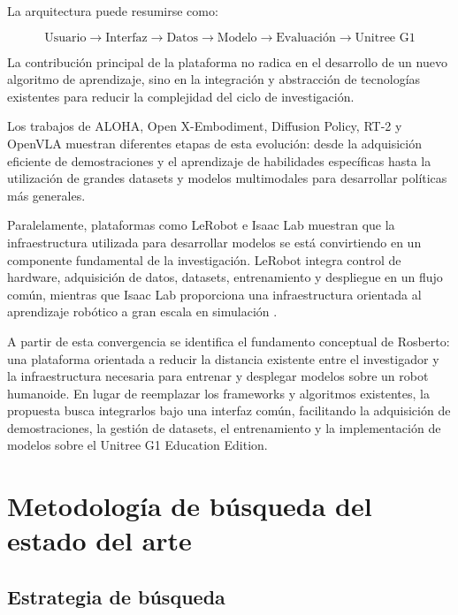 \documentclass[stu,12pt,floatsintext]{apa7}
\begin{document}
La arquitectura puede resumirse como:

\begin{equation}
\boxed{
\text{Usuario}
\rightarrow
\text{Interfaz}
\rightarrow
\text{Datos}
\rightarrow
\text{Modelo}
\rightarrow
\text{Evaluación}
\rightarrow
\text{Unitree G1}
}
\end{equation}

La contribución principal de la plataforma no radica en el desarrollo de un nuevo algoritmo de aprendizaje, sino en la integración y abstracción de tecnologías existentes para reducir la complejidad del ciclo de investigación.

Los trabajos de ALOHA, Open X-Embodiment, Diffusion Policy, RT-2 y OpenVLA muestran diferentes etapas de esta evolución: desde la adquisición eficiente de demostraciones y el aprendizaje de habilidades específicas hasta la utilización de grandes datasets y modelos multimodales para desarrollar políticas más generales.

Paralelamente, plataformas como LeRobot e Isaac Lab muestran que la infraestructura utilizada para desarrollar modelos se está convirtiendo en un componente fundamental de la investigación. LeRobot integra control de hardware, adquisición de datos, datasets, entrenamiento y despliegue en un flujo común, mientras que Isaac Lab proporciona una infraestructura orientada al aprendizaje robótico a gran escala en simulación \parencite{cadene2026lerobotopensourcelibraryendtoend}.

A partir de esta convergencia se identifica el fundamento conceptual de Rosberto: una plataforma orientada a reducir la distancia existente entre el investigador y la infraestructura necesaria para entrenar y desplegar modelos sobre un robot humanoide. En lugar de reemplazar los frameworks y algoritmos existentes, la propuesta busca integrarlos bajo una interfaz común, facilitando la adquisición de demostraciones, la gestión de datasets, el entrenamiento y la implementación de modelos sobre el Unitree G1 Education Edition.

\clearpage

\section{Metodología de búsqueda del estado del arte}

\subsection{Estrategia de búsqueda}
\end{document}
